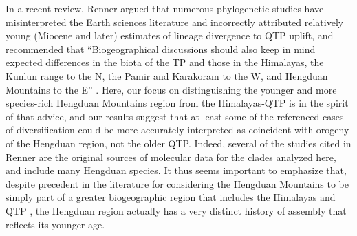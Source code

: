 \documentclass[9pt,twocolumn,twoside,lineno]{pnas-new}
\begin{document}
In a recent review, Renner \citep{Renner2016} argued that numerous
phylogenetic studies have misinterpreted the Earth sciences literature
and incorrectly attributed relatively young (Miocene and later)
estimates of lineage divergence to QTP uplift, and recommended that
``Biogeographical discussions should also keep in mind expected
differences in the biota of the TP and those in the Himalayas, the
Kunlun range to the N, the Pamir and Karakoram to the W, and Hengduan
Mountains to the E'' \citep[][p.~7]{Renner2016}. Here, our focus on
distinguishing the younger and more species-rich Hengduan Mountains
region from the Himalayas-QTP is in the spirit of that advice, and our
results suggest that at least some of the referenced cases of
diversification could be more accurately interpreted as coincident
with orogeny of the Hengduan region, not the older QTP. Indeed,
several of the studies cited in Renner \citep{Renner2016} are the
original sources of molecular data for the clades analyzed here, and
include many Hengduan species. It thus seems important to emphasize
that, despite precedent in the literature for considering the Hengduan
Mountains to be simply part of a greater biogeographic region that
includes the Himalayas and QTP
\citep[e.g.][]{ZhangJ2014,Nie2013,GaoY2013,Matuszak2016}, the Hengduan
region actually has a very distinct history of assembly that reflects
its younger age.



\end{document}
